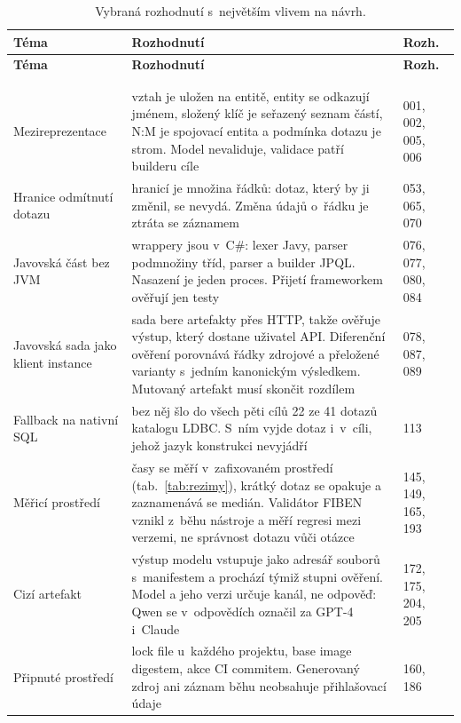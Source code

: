 {\footnotesize
\begin{longtable}{P{0.22} P{0.62} P{0.16}}
\toprule
\textbf{Téma} & \textbf{Rozhodnutí} & \textbf{Rozh.} \\
\midrule
\endfirsthead
\toprule
\textbf{Téma} & \textbf{Rozhodnutí} & \textbf{Rozh.} \\
\midrule
\endhead
\rule{0pt}{26pt}\\
\endfoot
\bottomrule
\caption{Vybraná rozhodnutí s~největším vlivem na návrh.}\label{tab:zajimavosti}\\
\endlastfoot
Mezireprezentace & vztah je uložen na entitě, entity se odkazují jménem, složený klíč je seřazený seznam částí, N:M je spojovací entita a podmínka dotazu je strom. Model nevaliduje, validace patří builderu cíle & 001, 002, 005, 006 \\
Hranice odmítnutí dotazu & hranicí je množina řádků: dotaz, který by ji změnil, se nevydá. Změna údajů o~řádku je ztráta se záznamem & 053, 065, 070 \\
Javovská část bez JVM & wrappery jsou v~C\#: lexer Javy, parser podmnožiny tříd, parser a builder JPQL. Nasazení je jeden proces. Přijetí frameworkem ověřují jen testy & 076, 077, 080, 084 \\
Javovská sada jako klient instance & sada bere artefakty přes HTTP, takže ověřuje výstup, který dostane uživatel API. Diferenční ověření porovnává řádky zdrojové a přeložené varianty s~jedním kanonickým výsledkem. Mutovaný artefakt musí skončit rozdílem & 078, 087, 089 \\
Fallback na nativní SQL & bez něj šlo do všech pěti cílů 22 ze 41 dotazů katalogu LDBC. S~ním vyjde dotaz i~v~cíli, jehož jazyk konstrukci nevyjádří & 113 \\
Měřicí prostředí & časy se měří v~zafixovaném prostředí (tab.~\ref{tab:rezimy}), krátký dotaz se opakuje a zaznamenává se medián. Validátor FIBEN vznikl z~běhu nástroje a měří regresi mezi verzemi, ne správnost dotazu vůči otázce & 145, 149, 165, 193 \\
Cizí artefakt & výstup modelu vstupuje jako adresář souborů s~manifestem a prochází týmiž stupni ověření. Model a jeho verzi určuje kanál, ne odpověď: Qwen se v~odpovědích označil za GPT-4 i~Claude & 172, 175, 204, 205 \\
Připnuté prostředí & lock file u~každého projektu, base image digestem, akce CI commitem. Generovaný zdroj ani záznam běhu neobsahuje přihlašovací údaje & 160, 186 \\
\end{longtable}}

